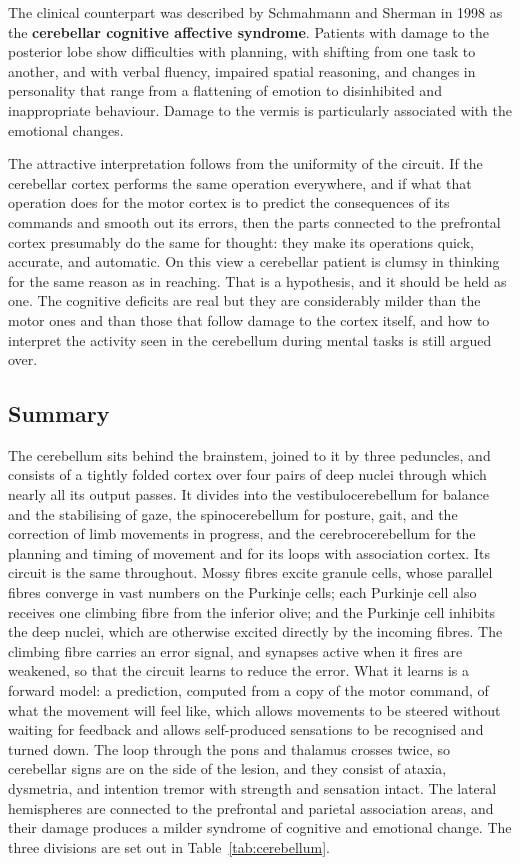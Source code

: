 \documentclass[11pt]{article}
\begin{document}
The clinical counterpart was described by Schmahmann and Sherman in 1998 as the \textbf{cerebellar cognitive affective syndrome}. Patients with damage to the posterior lobe show difficulties with planning, with shifting from one task to another, and with verbal fluency, impaired spatial reasoning, and changes in personality that range from a flattening of emotion to disinhibited and inappropriate behaviour. Damage to the vermis is particularly associated with the emotional changes.

The attractive interpretation follows from the uniformity of the circuit. If the cerebellar cortex performs the same operation everywhere, and if what that operation does for the motor cortex is to predict the consequences of its commands and smooth out its errors, then the parts connected to the prefrontal cortex presumably do the same for thought: they make its operations quick, accurate, and automatic. On this view a cerebellar patient is clumsy in thinking for the same reason as in reaching. That is a hypothesis, and it should be held as one. The cognitive deficits are real but they are considerably milder than the motor ones and than those that follow damage to the cortex itself, and how to interpret the activity seen in the cerebellum during mental tasks is still argued over.

\subsection{Summary}

The cerebellum sits behind the brainstem, joined to it by three peduncles, and consists of a tightly folded cortex over four pairs of deep nuclei through which nearly all its output passes. It divides into the vestibulocerebellum for balance and the stabilising of gaze, the spinocerebellum for posture, gait, and the correction of limb movements in progress, and the cerebrocerebellum for the planning and timing of movement and for its loops with association cortex. Its circuit is the same throughout. Mossy fibres excite granule cells, whose parallel fibres converge in vast numbers on the Purkinje cells; each Purkinje cell also receives one climbing fibre from the inferior olive; and the Purkinje cell inhibits the deep nuclei, which are otherwise excited directly by the incoming fibres. The climbing fibre carries an error signal, and synapses active when it fires are weakened, so that the circuit learns to reduce the error. What it learns is a forward model: a prediction, computed from a copy of the motor command, of what the movement will feel like, which allows movements to be steered without waiting for feedback and allows self-produced sensations to be recognised and turned down. The loop through the pons and thalamus crosses twice, so cerebellar signs are on the side of the lesion, and they consist of ataxia, dysmetria, and intention tremor with strength and sensation intact. The lateral hemispheres are connected to the prefrontal and parietal association areas, and their damage produces a milder syndrome of cognitive and emotional change. The three divisions are set out in Table~\ref{tab:cerebellum}.
\end{document}
